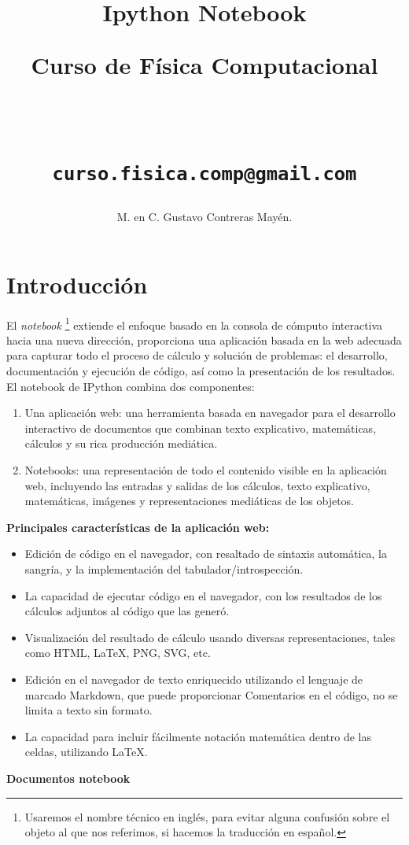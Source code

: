 \documentclass[12pt]{article}
\author{M. en C. Gustavo Contreras Mayén.}
\title{Ipython Notebook \\ \begin{Large} Curso de Física Computacional\end{Large} \\
\begin{small}
\texttt{curso.fisica.comp@gmail.com}
\end{small}}
\date{ }
\begin{document}
\maketitle
\fontsize{14}{14}\selectfont
\section{Introducción}
El \emph{notebook} \footnote{Usaremos el nombre técnico en inglés, para evitar alguna confusión sobre el objeto al que nos referimos, si hacemos la traducción en español.} extiende el enfoque basado en la consola de cómputo interactiva hacia una nueva dirección, proporciona una aplicación basada en la web adecuada para capturar todo el proceso de cálculo y solución de problemas: el desarrollo, documentación y ejecución de código, así como la presentación de los resultados. El notebook de IPython combina dos componentes: 
\begin{enumerate}
\item Una aplicación web: una herramienta basada en navegador para el desarrollo interactivo de documentos que combinan texto explicativo, matemáticas, cálculos y su rica producción mediática. 
\item Notebooks: una representación de todo el contenido visible en la aplicación web, incluyendo las entradas y salidas de los cálculos, texto explicativo, matemáticas, imágenes y representaciones mediáticas de los objetos.
\end{enumerate}
\textbf{Principales características de la aplicación web:}
\begin{itemize}
\item Edición de código en el navegador, con resaltado de sintaxis automática, la sangría, y la implementación del tabulador/introspección.
\item La capacidad de ejecutar código en el navegador, con los resultados de los cálculos adjuntos al código que las generó.
\item Visualización del resultado de cálculo usando diversas representaciones, tales como HTML, \LaTeX, PNG, SVG, etc.
\item Edición en el navegador de texto enriquecido utilizando el lenguaje de marcado Markdown, que puede proporcionar Comentarios en el código, no se limita a texto sin formato.
\item La capacidad para incluir fácilmente notación matemática dentro de las celdas, utilizando \LaTeX.
\end{itemize}
\textbf{Documentos notebook} \\ 
\end{document}
